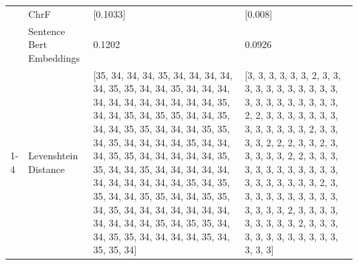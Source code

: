 \begin{tabular}{llll}
 & ChrF & [0.1033] & [0.008] \\
 & Sentence Bert Embeddings & 0.1202 & 0.0926 \\
\cline{1-4}
\multirow[t]{4}{*}{Sotta abudongo nga bukyaali bubisi.} & Levenshtein Distance & [35, 34, 34, 34, 35, 34, 34, 34, 34, 34, 35, 35, 34, 34, 35, 34, 34, 34, 34, 34, 34, 34, 34, 34, 34, 34, 35, 34, 34, 35, 34, 35, 35, 34, 34, 35, 34, 34, 35, 35, 34, 34, 34, 35, 35, 34, 35, 34, 34, 34, 34, 35, 34, 34, 34, 35, 35, 34, 34, 34, 34, 34, 35, 35, 34, 34, 35, 34, 34, 34, 34, 34, 34, 34, 34, 34, 34, 34, 35, 34, 35, 35, 34, 34, 35, 35, 34, 34, 35, 35, 34, 35, 34, 34, 34, 34, 34, 34, 34, 34, 34, 34, 34, 35, 34, 35, 35, 34, 34, 35, 35, 34, 34, 34, 34, 35, 34, 35, 35, 34] & [3, 3, 3, 3, 3, 3, 2, 3, 3, 3, 3, 3, 3, 3, 3, 3, 3, 3, 3, 3, 3, 3, 3, 3, 3, 3, 3, 2, 2, 3, 3, 3, 3, 3, 3, 3, 3, 3, 3, 3, 3, 3, 2, 3, 3, 3, 3, 2, 2, 2, 3, 3, 2, 3, 3, 3, 3, 3, 2, 2, 3, 3, 3, 3, 3, 3, 3, 3, 3, 3, 3, 3, 3, 3, 3, 3, 3, 3, 3, 2, 3, 3, 3, 3, 3, 3, 3, 3, 3, 3, 3, 3, 3, 3, 2, 3, 3, 3, 3, 3, 3, 3, 3, 3, 2, 3, 3, 3, 3, 3, 3, 3, 3, 3, 3, 3, 3, 3, 3, 3] \\

\end{tabular}

